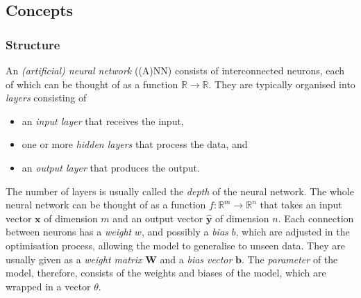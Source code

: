 \documentclass[a4paper,11pt,titlepage]{article}
\theoremstyle{definition}
\theoremstyle{plain}
\theoremstyle{remark}
\begin{document}
\subsection{Concepts}

\subsubsection{Structure}

An \textit{(artificial) neural network} ((A)NN) consists of interconnected neurons, each of which can be thought of as a function $\mathbb{R}\rightarrow\mathbb{R}$. They are typically organised into \textit{layers} consisting of

\begin{itemize}
    \item an \textit{input layer} that receives the input,
    \item one or more \textit{hidden layers} that process the data, and
    \item an \textit{output layer} that produces the output.
\end{itemize}

The number of layers is usually called the \textit{depth} of the neural network. The whole neural network can be thought of as a function $f: \mathbb{R}^m\rightarrow\mathbb{R}^n$ that takes an input vector $\mathbf{x}$ of dimension $m$ and an output vector $\mathbf{\hat{y}}$ of dimension $n$. Each connection between neurons has a \textit{weight} $w$, and possibly a \textit{bias} $b$, which are adjusted in the optimisation process, allowing the model to generalise to unseen data. They are usually given as a \textit{weight matrix} $\mathbf{W}$ and a \textit{bias vector} $\mathbf{b}$. The \textit{parameter} of the model, therefore, consists of the weights and biases of the model, which are wrapped in a vector $\theta$.
\end{document}
